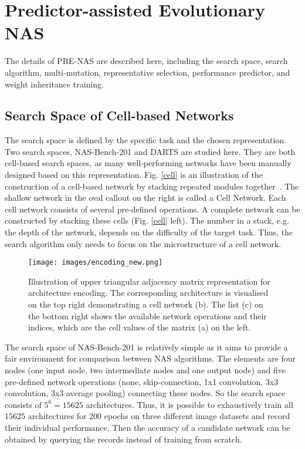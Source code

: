 \documentclass[sigconf]{acmart}
\begin{document}
\section{Predictor-assisted Evolutionary NAS}
\label{section3}
The details of PRE-NAS are described here, including the search space, search algorithm, multi-mutation, representative selection, performance predictor, and weight inheritance training.

\subsection{Search Space of Cell-based Networks}
\label{search_space}
The search space is defined by the specific task and the chosen representation.  Two search spaces, NAS-Bench-201 \cite{Ref:45} and DARTS \cite{Ref:10} are studied here.  They are both cell-based search spaces, as many well-performing networks have been manually designed based on this representation.  Fig. \ref{cell} is an illustration of the construction of a cell-based network by stacking repeated modules together~\cite{Ref:04,Ref:47}.  The shallow network in the oval callout on the right is called a Cell Network. Each cell network consists of several pre-defined operations. A complete network can be constructed by stacking these cells (Fig. \ref{cell} left).  The number in a stack, e.g. the depth of the network, depends on the difficulty of the target task.  Thus, the search algorithm only needs to focus on the microstructure of a cell network.

 \begin{figure*}[!t]
    \begin{center}
  	\texttt{[image: images/encoding\_new.png]}
  \caption{Illustration of upper triangular adjacency matrix representation for architecture encoding. The corresponding architecture is visualised on the top right demonstrating a cell network (b).  The list (c) on the bottom right shows the available network operations and their indices, which are the cell values of the matrix (a) on the left.}
\label{encoding}
  	\end{center}
\end{figure*} 

The search space of NAS-Bench-201 \cite{Ref:45} is relatively simple as it aims to provide a fair environment for comparison between NAS algorithms. The elements are four nodes (one input node, two intermediate nodes and one output node) and five pre-defined network operations (none, skip-connection, 1x1 convolution, 3x3 convolution, 3x3 average pooling) connecting these nodes. So the search space consists of $5^6 = 15625$ architectures.  Thus, it is possible to exhaustively train all $15625$ architectures for 200 epochs on three different image datasets and record their individual performance. Then the accuracy of a candidate network can be obtained by querying the records instead of training from scratch.
\end{document}

